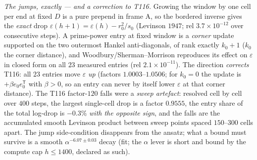 \documentclass[11pt,a4paper]{article}
\begin{document}
\emph{The jumps, exactly --- and a correction to T116.} Growing the window by one cell per end
at fixed $D$ is a pure prepend in frame A, so the bordered inverse gives the \emph{exact} drop
$\varepsilon(h{+}1)=\varepsilon(h)-r_0^2/s_0$ (Levinson $1947$; rel $3.7\times10^{-12}$ over
consecutive steps). A prime-power entry at fixed window is a \emph{corner} update supported on
the two outermost Hankel anti-diagonals, of rank exactly $k_0+1$ ($k_0$ the corner distance),
and Woodbury/Sherman--Morrison reproduces its effect on $\varepsilon$ in closed form on all $23$
measured entries (rel $2.1\times10^{-11}$). The direction \emph{corrects} T116: all $23$ entries
move $\varepsilon$ \emph{up} (factors $1.0003$--$1.0506$; for $k_0=0$ the update is
$+\beta e_0e_0^{\mathsf T}$ with $\beta>0$, so an entry can never by itself lower $\varepsilon$
at that corner distance). The T116 factor-$120$ falls were a \emph{sweep artefact}: resolved
cell by cell over $400$ steps, the largest single-cell drop is a factor $0.9555$, the entry
share of the total log-drop is $-0.3\%$ \emph{with the opposite sign}, and the falls are the
accumulated smooth Levinson product between sweep points spaced $150$--$300$ cells apart. The
jump side-condition disappears from the ansatz; what a bound must survive is a smooth
$\alpha^{-6.07\pm0.03}$ decay (fit; the $\alpha$ lever is short and bound by the compute cap
$h\le1400$, declared as such).
\end{document}
